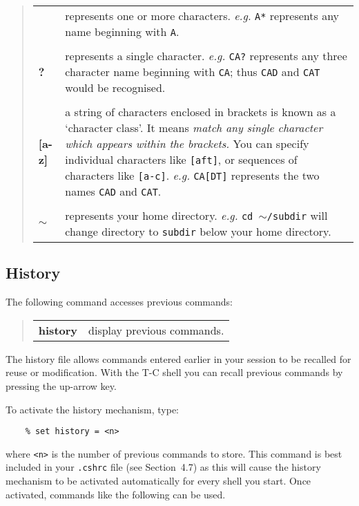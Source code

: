 \documentclass[twoside,11pt]{article}
\newcommand{\htmlref}[2]{#1}
\begin{document}
\begin{quote}
\begin{tabular}{lp{77mm}}

{\bf  *}  & represents one or more characters. {\em e.g.}\/ {\tt A*}
  represents any name beginning with {\tt A}.\\
\\
{\bf  ?}  & represents a single character.  {\em e.g.}\/ {\tt CA?}
  represents any three character name beginning with {\tt CA}; thus {\tt CAD}
  and {\tt CAT} would be recognised.\\
\\
{\bf  [a-z]}   & a string of characters enclosed in brackets is known as a
  `character class'.  It means {\em match any single character which appears
  within the brackets.}  You can specify individual characters like
  {\tt [aft]}, or sequences of   characters like {\tt [a-c]}.  {\em e.g.}\/
  {\tt CA[DT]} represents the two names {\tt CAD} and {\tt CAT}.\\
\\
{\bf $\sim$}   & represents your home directory.  {\em e.g.}\/ {\tt cd
  {\bf $\sim$}/subdir} will change directory to {\tt subdir} below your home
  directory.

\end{tabular}
\end{quote}


\subsection{History}

The following command accesses previous commands:
\begin{quote}
\begin{tabular}{lp{67mm}}

{\bf history}  & display previous commands.

\end{tabular}
\end{quote}
The history file allows commands entered earlier in your session to be recalled
for reuse or modification.
With the T-C shell you can recall previous commands by pressing the
up-arrow key.

To activate the history mechanism, type:
\begin{verbatim}
    % set history = <n>
\end{verbatim}
where {\tt <n>} is the number of previous commands to store.
This command is best included in your {\tt .cshrc} file
(see \htmlref{Section~4.7}{ss1})
as this will cause the history mechanism to be
activated automatically for every shell you start.
Once activated, commands like the following can be used.
\end{document}
